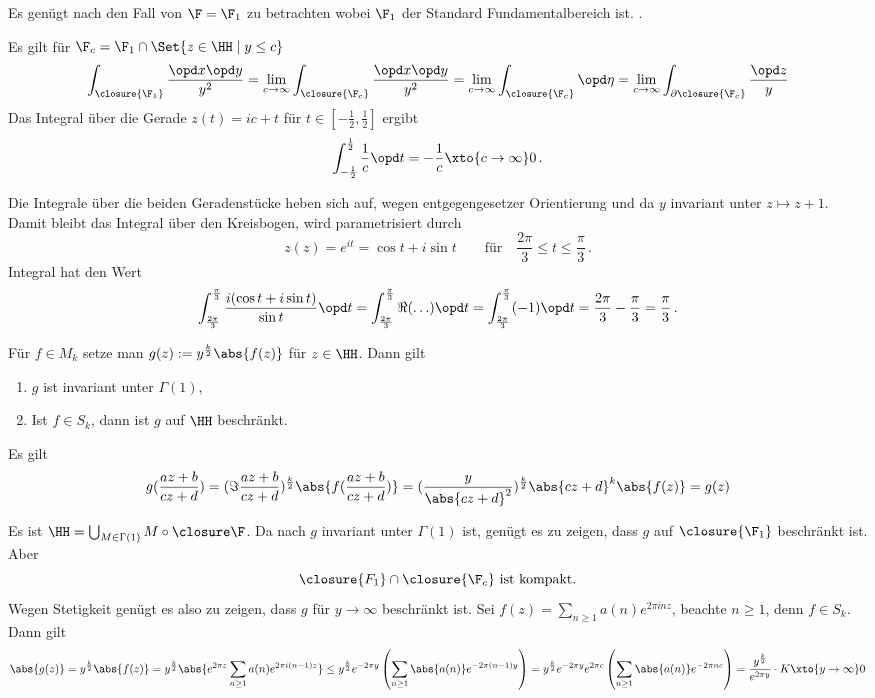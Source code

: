 \begin{bewe}
	Es genügt nach  den Fall von $\F = \F_1$ zu betrachten wobei $\F_1$ der Standard Fundamentalbereich ist. .
	
	Es gilt für $\F_c = \F_1 \cap \Set{z \in \HH \mid y \leq c}$
	\[
		\int_{\closure{\F_1}} \frac{\opd x \opd y}{y^2}
		= \lim_{c \to \infty} \int_{\closure{\F_c}} \frac{\opd x \opd y}{y^2}
		= \lim_{c \to \infty} \int_{\closure{\F_c}} \opd \eta %
		= \lim_{c \to \infty} \int_{\partial \closure{\F_c}} \frac{\opd z}{y}
	\]
	Das Integral über die Gerade $z(t) = ic + t$ für $t \in [-\frac{1}{2}, \frac{1}{2}]$ ergibt
	\[
		\int_{-\frac{1}{2}}^{\frac{1}{2}} \frac{1}{c} \opd t = - \frac{1}{c} \xto{c \to \infty} 0
		\,.
	\]
	
	Die Integrale über die beiden Geradenstücke heben sich auf, wegen entgegengesetzer Orientierung und da $y$ invariant unter $z \mapsto z +1$.
	Damit bleibt das Integral über den Kreisbogen, wird parametrisiert durch
	\[
		z(z) = e^{it} = \cos t + i\sin t \qquad \text{für}\quad \frac{2\pi}{3} \leq t \leq \frac{\pi}{3}
		\,.
	\]
	Integral hat den Wert
	\[
		\int_{\frac{2\pi}{3}}^{\frac{\pi}{3}} \frac{i(\cos t + i\sin t)}{\sin t} \opd t
		= \int_{\frac{2\pi}{3}}^{\frac{\pi}{3}} \Re(\ldots) \opd t
		= \int_{\frac{2\pi}{3}}^{\frac{\pi}{3}} (-1)\opd t
		= \frac{2\pi}{3} - \frac{\pi}{3} = \frac{\pi}{3}
		\,.
	\]
\end{bewe}

\begin{satz}
	Für $f\in M_k$ setze man $g(z) := y^{\frac{k}{2}} \abs{f(z)}$ für $z\in\HH$.
	Dann gilt
	\begin{enumerate}
		\item $g$ ist invariant unter $\Gamma(1)$,
		\item Ist $f \in S_k$, dann ist $g$ auf $\HH$ beschränkt.
	\end{enumerate}
\end{satz}

\begin{bewe-list}
	\item Es gilt
	\[
		g(\frac{az+b}{cz+d}) = (\Im \frac{az+b}{cz+d})^{\frac{k}{2}} \abs{f(\frac{az+b}{cz+d})}
		= (\frac{y}{\abs{cz+d}^2})^{\frac{k}{2}} \abs{cz+d}^k \abs{f(z)} = g(z)
	\]
	
	\item Es ist $\HH = \bigcup_{M\in\Gamma(1)} M \circ \closure\F$. Da nach  $g$ invariant unter $\Gamma(1)$ ist, genügt es zu zeigen, dass $g$ auf $\closure{\F_1}$ beschränkt ist.
	Aber
	\[
		\closure{F_1} \cap \closure{\F_c} \text{ ist kompakt.}
	\]
	Wegen Stetigkeit genügt es also zu zeigen, dass $g$ für $y \to \infty$ beschränkt ist.
	Sei $f(z) = \sum_{n\geq 1} a(n) e^{2\pi inz}$, beachte $n\geq1$, denn $f \in S_k$.
	Dann gilt
	\[
		\abs{g(z)} = y^{\frac{k}{2}} \abs{f(z)}
		= y^{\frac{k}{2}} \abs{e^{2\pi z} \sum_{n\geq 1} a(n) e^{2\pi i(n-1)z} }
		\leq y^{\frac{k}{2}} e^{-2\pi y} \left( \sum_{n\geq 1} \abs{a(n)} e^{-2\pi (n-1)y} \right)
		= y^{\frac{k}{2}} e^{-2\pi y} e^{2\pi c} \left( \sum_{n\geq1} \abs{a(n)} e^{-2\pi nc} \right)
		= \frac{y^{\frac{k}{2}}}{e^{2\pi y}} \cdot K
		\xto{y\to\infty} 0
	\]
\end{bewe-list}

